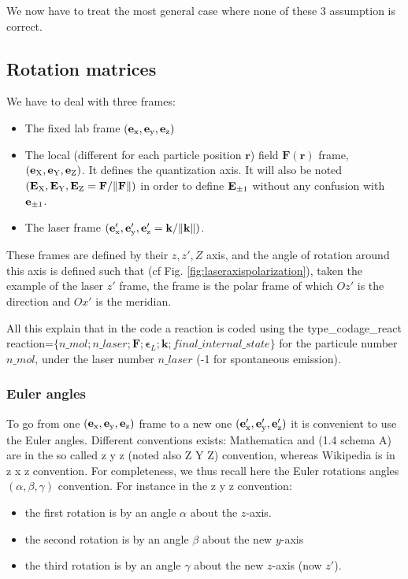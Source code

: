 \documentclass[amsmath,amssymb,nofootinbib]{revtex4-2}
\begin{document}
	 	 
We now have to treat the most general case where none of these 3 assumption is correct.
	 	 	 	 \subsection{Rotation matrices}
	 	 	 	
	 	 	 	We have to deal with three frames:
	 	 		 	 \begin{itemize}
	 	 	 		\item The fixed lab frame 	$(\bf{e}_{\rm x},  \bf{e}_{\rm y},  \bf{e}_{\rm z}  )$ 
	 	 	 		\item The local (different for each particle position $\bm r$) field $\bm F(\bm r)$ frame, 	$(\bf{e}_{\rm X},  \bf{e}_{\rm Y},  \bf{e}_{\rm Z})$. It defines the quantization axis. It  will also be noted
	 	 	 				$(\bf{E}_{\rm X},  \bf{E}_{\rm Y},  \bf{E}_{\rm Z} = \bm{F}/\| \bm{F} \|)$ in order to define ${\bf{E}}_{\pm 1}$ without any  confusion with  ${\bf{e}}_{\pm 1}$.
	 	 	 		\item The laser  frame	$(\bf{e}'_{\rm x},  \bf{e}'_{\rm y},  \bf{e}'_{\rm z} = \bm{k}/\| \bm{k} \|)$.
	 	 	 	\end{itemize}
	 	 	 These frames are defined  by their $z,z',Z$ axis, and the angle of rotation around this axis is defined such  that (cf Fig.
	 	 	 \ref{fig:laseraxispolarization}), taken the example of the laser $z'$ frame, the frame is the polar frame of which $Oz'$ is the direction and $Ox'$ is the meridian.
	 	 	 	
	 	 	 	
	 	 	 	All this explain that in the code a reaction is coded using the   type\_codage\_react reaction=$\{n\_mol; n\_laser; \bm F; \bm \epsilon_L; \bm k; final\_internal\_state\}$ for the particule number $n\_mol$, under the laser number $n\_laser$ (-1 for spontaneous emission).
	 	 	 
	 	 	 	 	\subsubsection{Euler angles}
	 	 	 	 	
	 	 	 	 	To go from one 	$(\bf{e}_{\rm x},  \bf{e}_{\rm y},  \bf{e}_{\rm z}  )$  frame to a new one $(\bf{e}'_{\rm x},  \bf{e}'_{\rm y},  \bf{e}'_{\rm z} )$ it is convenient to use the  Euler angles.
	 	 	 	Different conventions exists: Mathematica and  \cite{varshalovich1988quantum} (1.4 schema A) are in the so called z y z (noted also Z Y Z) convention, whereas Wikipedia is in z x z convention. For completeness, we thus recall  here the
	 	 	 	 Euler rotations  angles	 $(\alpha,\beta,\gamma)$ convention. 
	 	 	 	 For instance in the 
	 	 	 	 	z y z convention:
	 	 	 	 	\begin{itemize}
	 	 	 	 		\item  	 	 the first rotation is by an angle $\alpha$ about the $z$-axis.
	 	 	 	 	\item the second rotation is by an angle $\beta$  about the new $y$-axis
	 	 	 	 	\item the third rotation is by an angle $\gamma$  about the new $z$-axis (now $z'$).
	 	 	 	 	\end{itemize}
 	 	 	 	
\end{document}
